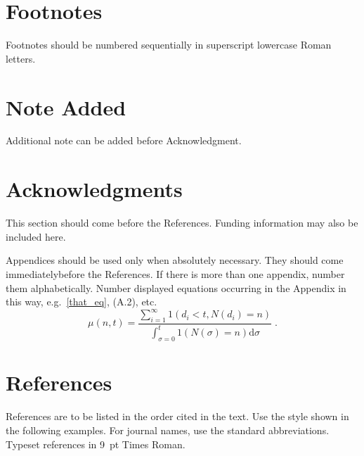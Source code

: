 \documentclass[11pt,twoside]{article}
\begin{document}
\begin{multicols}{2}
\section{Footnotes}

Footnotes should be numbered sequentially in superscript lowercase Roman letters.

\section*{Note Added}

Additional note can be added before Acknowledgment.

\section*{Acknowledgments}

This section should come before the References. Funding information may also be included here.

\appendix{}

Appendices should be used only when absolutely necessary. They should come immediately\break before the References. If there is more than one appendix, number them alphabetically. Number\break
displayed equations occurring in the Appendix in this way, e.g.~\eqref{that_eq}, (A.2), etc.
\begin{equation}
\mu(n,t) = \frac{\displaystyle\sum^\infty_{i=1} 1(d_i < t, N(d_i) = n)}{\displaystyle\int^t_{\sigma=0} 1(N(\sigma) = n)\mathrm{d}\sigma}\; .
\label{that_eq}
\end{equation}

\section*{References}

References are to be listed in the order cited in the text. Use the style shown in the following examples. For journal names, use the standard abbreviations. Typeset references in 9~pt Times Roman.


%
\begin{thebibliography}{000}
%
%


\end{thebibliography}
\end{multicols}
\end{document}
